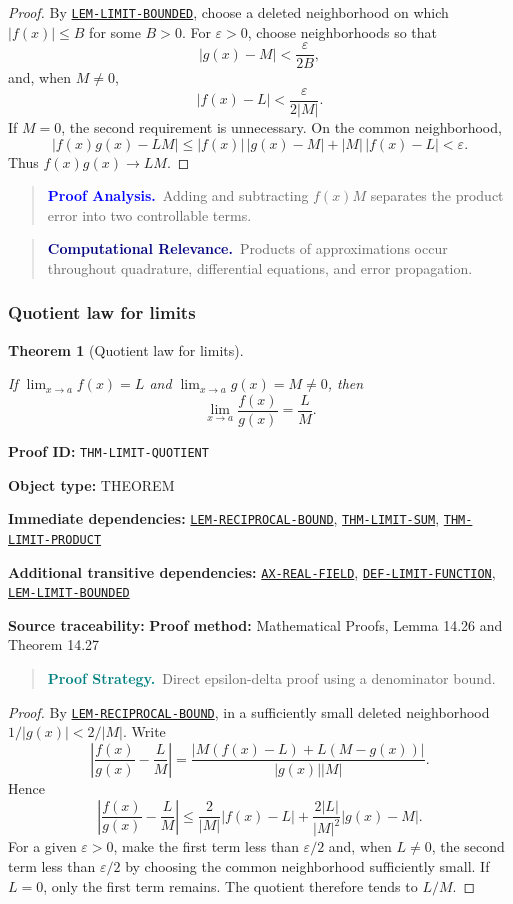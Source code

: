 \documentclass[10pt]{article}
\newcommand{\pidraw}[1]{\begingroup\urlstyle{tt}\nolinkurl{#1}\endgroup}
\newcommand{\pidref}[1]{\hyperref[prf:#1]{\pidraw{#1}}}
\newcommand{\pid}[1]{\pidref{#1}}
\newtheorem{theorem}{Theorem}[section]
\theoremstyle{definition}
\theoremstyle{remark}
\newenvironment{proofstrategy}
{\begin{quote}\small\noindent\textbf{\textcolor{teal}{Proof Strategy.}}\ }
{\end{quote}}
\newenvironment{proofanalysis}
{\begin{quote}\small\noindent\textbf{\textcolor{blue}{Proof Analysis.}}\ }
{\end{quote}}
\newenvironment{computationalrelevance}
{\begin{quote}\small\noindent\textbf{\textcolor{navy}{Computational Relevance.}}\ }
{\end{quote}}
\newcommand{\meta}[2]{\noindent\textbf{#1:} #2\par}
\begin{document}
\begin{proof}

By \pid{LEM-LIMIT-BOUNDED}, choose a deleted neighborhood on which
$|f(x)|\le B$ for some $B>0$. For $\varepsilon>0$, choose neighborhoods so that
\[
|g(x)-M|<\frac{\varepsilon}{2B},
\]
and, when $M\ne0$,
\[
|f(x)-L|<\frac{\varepsilon}{2|M|}.
\]
If $M=0$, the second requirement is unnecessary. On the common neighborhood,
\[
|f(x)g(x)-LM|
\le |f(x)|\,|g(x)-M|+|M|\,|f(x)-L|<\varepsilon.
\]
Thus $f(x)g(x)\to LM$.

\end{proof}

\begin{proofanalysis}Adding and subtracting $f(x)M$ separates the product error into two controllable terms.\end{proofanalysis}

\begin{computationalrelevance}Products of approximations occur throughout quadrature, differential equations, and error propagation.\end{computationalrelevance}

\subsubsection{Quotient law for limits}

\begin{theorem}[Quotient law for limits]\label{prf:THM-LIMIT-QUOTIENT}

If $\lim_{x\to a}f(x)=L$ and $\lim_{x\to a}g(x)=M\ne0$, then
\[
\lim_{x\to a}\frac{f(x)}{g(x)}=\frac{L}{M}.
\]

\end{theorem}

\meta{Proof ID}{\pidraw{THM-LIMIT-QUOTIENT}}
\meta{Object type}{THEOREM}
\meta{Immediate dependencies}{\pidref{LEM-RECIPROCAL-BOUND}, \pidref{THM-LIMIT-SUM}, \pidref{THM-LIMIT-PRODUCT}}
\meta{Additional transitive dependencies}{\pidref{AX-REAL-FIELD}, \pidref{DEF-LIMIT-FUNCTION}, \pidref{LEM-LIMIT-BOUNDED}}
\meta{Source traceability}{\textbf{Proof method:} Mathematical Proofs, Lemma 14.26 and Theorem 14.27}

\begin{proofstrategy}Direct epsilon-delta proof using a denominator bound.\end{proofstrategy}

\begin{proof}

By \pid{LEM-RECIPROCAL-BOUND}, in a sufficiently small deleted neighborhood
$1/|g(x)|<2/|M|$. Write
\[
\left|\frac{f(x)}{g(x)}-\frac{L}{M}\right|
=
\frac{|M(f(x)-L)+L(M-g(x))|}{|g(x)||M|}.
\]
Hence
\[
\left|\frac{f(x)}{g(x)}-\frac{L}{M}\right|
\le
\frac{2}{|M|}|f(x)-L|
+\frac{2|L|}{|M|^2}|g(x)-M|.
\]
For a given $\varepsilon>0$, make the first term less than $\varepsilon/2$
and, when $L\ne0$, the second term less than $\varepsilon/2$ by choosing the
common neighborhood sufficiently small. If $L=0$, only the first term remains.
The quotient therefore tends to $L/M$.

\end{proof}
\end{document}
